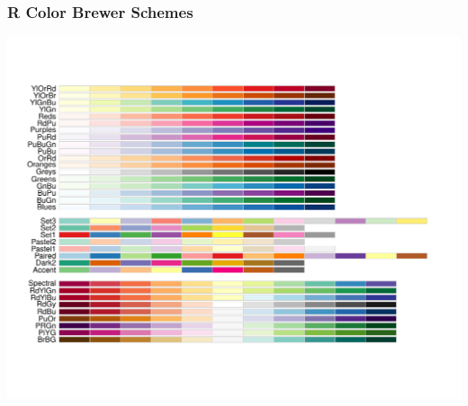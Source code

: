 \documentclass[12pt]{beamer}\usepackage[]{graphicx}\usepackage[]{color}
\newenvironment{knitrout}{}{} %
\begin{document}

\begin{frame}[fragile]
\frametitle{R Color Brewer Schemes}
\begin{knitrout}\scriptsize
{}\color{fgcolor}

{\centering \includegraphics[width=.8\linewidth,height=.8\linewidth]{figure/colorbrewer-1} 

}



\end{knitrout}
\end{frame}

\end{document}
